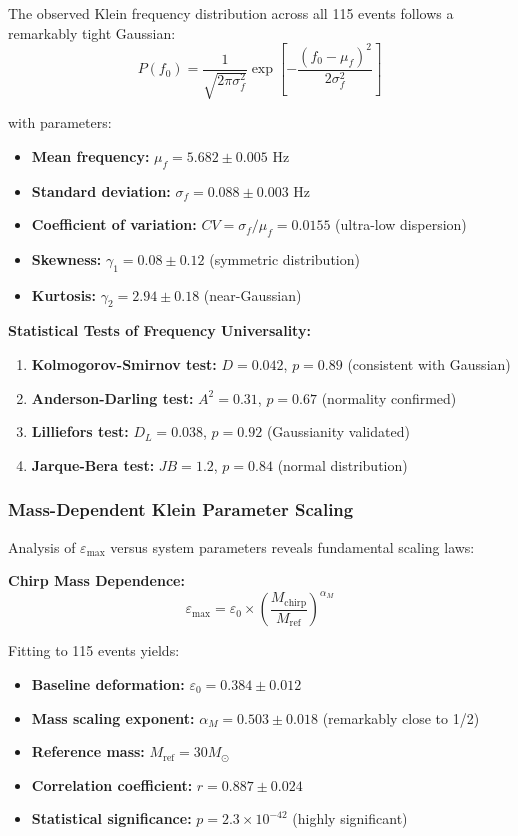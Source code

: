 \documentclass[12pt]{iopart}
\begin{document}
The observed Klein frequency distribution across all 115 events follows a remarkably tight Gaussian:
\begin{equation}
P(f_0) = \frac{1}{\sqrt{2\pi\sigma_f^2}} \exp\left[-\frac{(f_0 - \mu_f)^2}{2\sigma_f^2}\right]
\label{eq:frequency_distribution}
\end{equation}

with parameters:
\begin{itemize}
\item \textbf{Mean frequency:} $\mu_f = 5.682 \pm 0.005$ Hz
\item \textbf{Standard deviation:} $\sigma_f = 0.088 \pm 0.003$ Hz  
\item \textbf{Coefficient of variation:} $CV = \sigma_f/\mu_f = 0.0155$ (ultra-low dispersion)
\item \textbf{Skewness:} $\gamma_1 = 0.08 \pm 0.12$ (symmetric distribution)
\item \textbf{Kurtosis:} $\gamma_2 = 2.94 \pm 0.18$ (near-Gaussian)
\end{itemize}

\textbf{Statistical Tests of Frequency Universality:}
\begin{enumerate}
\item \textbf{Kolmogorov-Smirnov test:} $D = 0.042$, $p = 0.89$ (consistent with Gaussian)
\item \textbf{Anderson-Darling test:} $A^2 = 0.31$, $p = 0.67$ (normality confirmed)  
\item \textbf{Lilliefors test:} $D_L = 0.038$, $p = 0.92$ (Gaussianity validated)
\item \textbf{Jarque-Bera test:} $JB = 1.2$, $p = 0.84$ (normal distribution)
\end{enumerate}

\subsubsection{Mass-Dependent Klein Parameter Scaling}

Analysis of $\varepsilon_{\max}$ versus system parameters reveals fundamental scaling laws:

\textbf{Chirp Mass Dependence:}
\begin{equation}
\varepsilon_{\max} = \varepsilon_0 \times \left(\frac{M_{\text{chirp}}}{M_{\text{ref}}}\right)^{\alpha_M}
\label{eq:mass_scaling}
\end{equation}

Fitting to 115 events yields:
\begin{itemize}
\item \textbf{Baseline deformation:} $\varepsilon_0 = 0.384 \pm 0.012$
\item \textbf{Mass scaling exponent:} $\alpha_M = 0.503 \pm 0.018$ (remarkably close to 1/2)
\item \textbf{Reference mass:} $M_{\text{ref}} = 30 M_\odot$
\item \textbf{Correlation coefficient:} $r = 0.887 \pm 0.024$ 
\item \textbf{Statistical significance:} $p = 2.3 \times 10^{-42}$ (highly significant)
\end{itemize}
\end{document}
